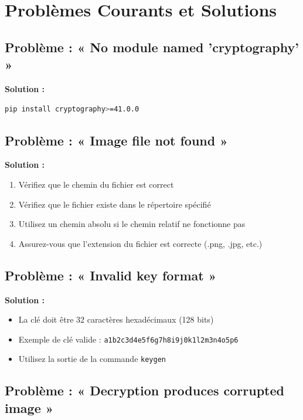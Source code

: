 \documentclass[12pt,a4paper]{report}
\begin{document}
\section{Problèmes Courants et Solutions}

\subsection{Problème : « No module named 'cryptography' »}

\textbf{Solution :}
\begin{lstlisting}[language=bash]
pip install cryptography>=41.0.0
\end{lstlisting}

\subsection{Problème : « Image file not found »}

\textbf{Solution :}
\begin{enumerate}
    \item Vérifiez que le chemin du fichier est correct
    \item Vérifiez que le fichier existe dans le répertoire spécifié
    \item Utilisez un chemin absolu si le chemin relatif ne fonctionne pas
    \item Assurez-vous que l'extension du fichier est correcte (.png, .jpg, etc.)
\end{enumerate}

\subsection{Problème : « Invalid key format »}

\textbf{Solution :}
\begin{itemize}
    \item La clé doit être 32 caractères hexadécimaux (128 bits)
    \item Exemple de clé valide : \texttt{a1b2c3d4e5f6g7h8i9j0k1l2m3n4o5p6}
    \item Utilisez la sortie de la commande \texttt{keygen}
\end{itemize}

\subsection{Problème : « Decryption produces corrupted image »}
\end{document}
